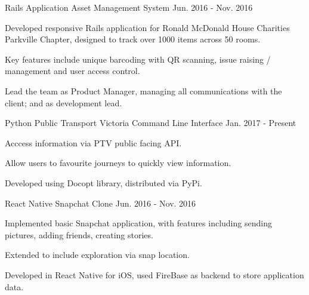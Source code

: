 \begin{cventries}
  \cventry
    {Rails Application}
    {Asset Management System}
    {}
    {Jun. 2016 - Nov. 2016}
    {
      \begin{cvitems}
        \item {Developed responsive Rails application for Ronald McDonald House Charities Parkville Chapter, designed to track over 1000 items across 50 rooms.}
        \item {Key features include unique barcoding with QR scanning, issue raising / management and user access control.}
        \item {Lead the team as Product Manager, managing all communications with the client; and as development lead.}
      \end{cvitems}
    }
  \cventry
    {Python}
    {Public Transport Victoria Command Line Interface}
    {}
    {Jan. 2017 - Present}
    {
      \begin{cvitems}
      	\item {Acccess information via PTV public facing API.}
      	\item {Allow users to favourite journeys to quickly view information.}
      	\item {Developed using Docopt library, distributed via PyPi.}
      \end{cvitems}
    }
   \cventry
    {React Native}
    {Snapchat Clone}
    {}
    {Jun. 2016 - Nov. 2016}
    {
      \begin{cvitems}
      	\item {Implemented basic Snapchat application, with features including sending pictures, adding friends, creating stories.}
      	\item {Extended to include exploration via snap location.}
      	\item {Developed in React Native for iOS, used FireBase as backend to store application data.}
      \end{cvitems}
    }
\end{cventries}
\vspace{-5mm}